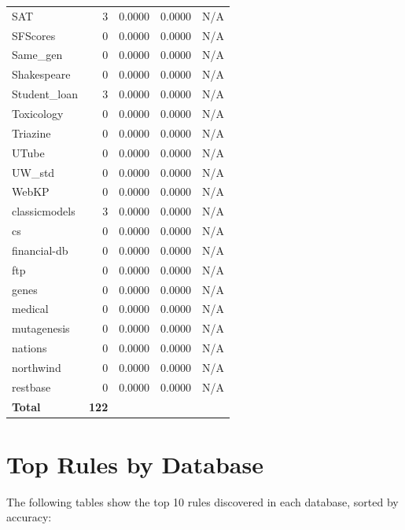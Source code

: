 \documentclass[11pt,a4paper]{article}
\begin{document}
\begin{table}[h!]
\begin{tabular}{|l|r|r|r|r|}
SAT & 3 & 0.0000 & 0.0000 & N/A \\
SFScores & 0 & 0.0000 & 0.0000 & N/A \\
Same_gen & 0 & 0.0000 & 0.0000 & N/A \\
Shakespeare & 0 & 0.0000 & 0.0000 & N/A \\
Student_loan & 3 & 0.0000 & 0.0000 & N/A \\
Toxicology & 0 & 0.0000 & 0.0000 & N/A \\
Triazine & 0 & 0.0000 & 0.0000 & N/A \\
UTube & 0 & 0.0000 & 0.0000 & N/A \\
UW_std & 0 & 0.0000 & 0.0000 & N/A \\
WebKP & 0 & 0.0000 & 0.0000 & N/A \\
classicmodels & 3 & 0.0000 & 0.0000 & N/A \\
cs & 0 & 0.0000 & 0.0000 & N/A \\
financial-db & 0 & 0.0000 & 0.0000 & N/A \\
ftp & 0 & 0.0000 & 0.0000 & N/A \\
genes & 0 & 0.0000 & 0.0000 & N/A \\
medical & 0 & 0.0000 & 0.0000 & N/A \\
mutagenesis & 0 & 0.0000 & 0.0000 & N/A \\
nations & 0 & 0.0000 & 0.0000 & N/A \\
northwind & 0 & 0.0000 & 0.0000 & N/A \\
restbase & 0 & 0.0000 & 0.0000 & N/A \\
\hline
\textbf{Total} & \textbf{122} & & & \\
\hline
\end{tabular}
\end{table}

\section{Top Rules by Database}
The following tables show the top 10 rules discovered in each database, sorted by accuracy:
\end{document}
